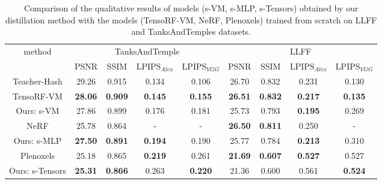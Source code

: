 \documentclass[letterpaper]{article} \usepackage{aaai23}  \usepackage{times}  \usepackage{helvet}  \usepackage{courier}  \usepackage[hyphens]{url}  \usepackage{graphicx} \urlstyle{rm} \def\UrlFont{\rm}  \usepackage{natbib}  \usepackage{caption} \frenchspacing  \setlength{\pdfpagewidth}{8.5in}  \setlength{\pdfpageheight}{11in}  \usepackage{multirow}
\begin{document}
\begin{table*}[t]
\centering
\begin{tabular}{c|cccc|cccc}
\hline
\multirow{2}{*}{method} & \multicolumn{4}{c|}{TanksAndTemple}                                            & \multicolumn{4}{c}{LLFF}                                                       \\ \cline{2-9} 
                        & PSNR           & SSIM           & $\text{LPIPS}_{Alex}$ & $\text{LPIPS}_{VGG}$ & PSNR           & SSIM           & $\text{LPIPS}_{Alex}$ & $\text{LPIPS}_{VGG}$ \\ \hline
Teacher-Hash            & 29.26          & 0.915          & 0.134                 & 0.106                & 26.70          & 0.832          & 0.231                 & 0.130                \\ \hline
TensoRF-VM              & \textbf{28.06} & \textbf{0.909} & \textbf{0.145}        & \textbf{0.155}       & \textbf{26.51} & \textbf{0.832} & \textbf{0.217}        & \textbf{0.135}       \\
Ours: s-VM              & 27.86          & 0.899          & 0.176        & 0.181                & 25.73          & 0.793          & \textbf{0.195}        & 0.269                \\ \hline
NeRF                    & 25.78 & 0.864 & -                     & -                    & \textbf{26.50} & \textbf{0.811} & 0.250                 & -                    \\
Ours: s-MLP             & \textbf{27.50} & \textbf{0.891} & \textbf{0.194}        & 0.190                & 25.77 & 0.784 & \textbf{0.213}        & 0.310                \\ \hline
Plenoxels               & 25.18 & 0.865 & \textbf{0.219}        & 0.261                & \textbf{21.69} & \textbf{0.607} & \textbf{0.527}        & 0.527                \\
Ours: s-Tensors          & \textbf{25.31} & \textbf{0.866} & 0.263                 & \textbf{0.220}       & 21.36 & 0.600 & 0.561                 & \textbf{0.524}       \\ \hline
\end{tabular}
\caption{Comparison of the qualitative results of models (s-VM, s-MLP, s-Tensors) obtained by our distillation method with the models (TensoRF-VM, NeRF, Plenoxels) trained from scratch on LLFF and TanksAndTemples datasets.}
\label{table-INGP2others}
\end{table*}
\end{document}
